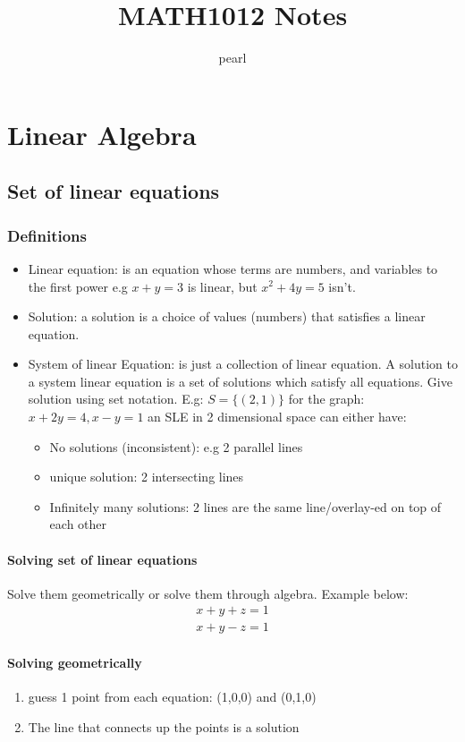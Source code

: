 \documentclass[11pt]{book}
\author{pearl}
\title{MATH1012 Notes}
\begin{document}
\maketitle
\chapter{Linear Algebra}
\section{Set of linear equations}
\subsection{Definitions}
\begin{itemize}
	\item{Linear equation: is an equation whose terms are numbers, and variables to the first power e.g $x+y=3$ is linear, but  $x^{2}+4y=5$ isn't.}
	\item{Solution: a solution is a choice of values (numbers) that satisfies a linear equation.}
	\item{System of linear Equation: is just a collection of linear equation. A solution to a system linear equation is a set of solutions which satisfy all equations. Give solution using set notation. E.g: $S=\{\left(2,1\right)\}$ for the graph: $x+2y=4, x-y=1$ an SLE in 2 dimensional space can either have:
	\begin{itemize}
		\item{No solutions (inconsistent): e.g 2 parallel lines}
		\item{unique solution: 2 intersecting lines}
		\item{Infinitely many solutions: 2 lines are the same line/overlay-ed on top of each other}
	\end{itemize}
	}
\end{itemize}
\subsubsection{Solving set of linear equations}
\par{Solve them geometrically or solve them through algebra. Example below:}
\begin{align*}
	x+y+z=1 \\ 
	x+y-z=1
\end{align*}
\subsubsection{Solving geometrically}
\begin{enumerate}
	\item{guess 1 point from each equation: (1,0,0) and (0,1,0)}
	\item{The line that connects up the points is a solution}
\end{enumerate}
\end{document}
